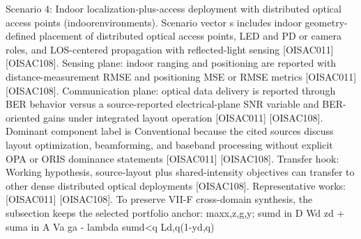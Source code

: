 {}Scenario 4: Indoor localization-plus-access deployment with distributed optical access points (indoor\markdownRendererUnderscore{}environments).\markdownRendererHardLineBreak
{}Scenario vector s includes indoor geometry-defined placement of distributed optical access points, LED and PD or camera roles, and LOS-centered propagation with reflected-light sensing [O\markdownRendererUnderscore{}ISAC\markdownRendererUnderscore{}011] [O\markdownRendererUnderscore{}ISAC\markdownRendererUnderscore{}108]. Sensing plane: indoor ranging and positioning are reported with distance-measurement RMSE and positioning MSE or RMSE metrics [O\markdownRendererUnderscore{}ISAC\markdownRendererUnderscore{}011] [O\markdownRendererUnderscore{}ISAC\markdownRendererUnderscore{}108]. Communication plane: optical data delivery is reported through BER behavior versus a source-reported electrical-plane SNR variable and BER-oriented gains under integrated layout operation [O\markdownRendererUnderscore{}ISAC\markdownRendererUnderscore{}011] [O\markdownRendererUnderscore{}ISAC\markdownRendererUnderscore{}108]. Dominant component label is Conventional because the cited sources discuss layout optimization, beamforming, and baseband processing without explicit OPA or ORIS dominance statements [O\markdownRendererUnderscore{}ISAC\markdownRendererUnderscore{}011] [O\markdownRendererUnderscore{}ISAC\markdownRendererUnderscore{}108]. Transfer hook: Working hypothesis, source-layout plus shared-intensity objectives can transfer to other dense distributed optical deployments [O\markdownRendererUnderscore{}ISAC\markdownRendererUnderscore{}108]. Representative works: [O\markdownRendererUnderscore{}ISAC\markdownRendererUnderscore{}011] [O\markdownRendererUnderscore{}ISAC\markdownRendererUnderscore{}108].\markdownRendererInterblockSeparator
{}
\markdownRendererSectionEnd \markdownRendererSectionBegin
{}\markdownRendererInterblockSeparator
{}To preserve VII-F cross-domain synthesis, the subsection keeps the selected portfolio anchor:\markdownRendererParagraphSeparator
{}\markdownRendererDollarSign{}\markdownRendererDollarSign{}\markdownRendererSoftLineBreak
{}\markdownRendererBackslash{}max\markdownRendererUnderscore{}\markdownRendererLeftBrace{}x,z,g,y\markdownRendererRightBrace{}; \markdownRendererBackslash{}sum\markdownRendererUnderscore{}\markdownRendererLeftBrace{}d \markdownRendererBackslash{}in D\markdownRendererRightBrace{} W\markdownRendererUnderscore{}d z\markdownRendererUnderscore{}d + \markdownRendererBackslash{}sum\markdownRendererUnderscore{}\markdownRendererLeftBrace{}a \markdownRendererBackslash{}in A\markdownRendererRightBrace{} V\markdownRendererUnderscore{}a g\markdownRendererUnderscore{}a - \markdownRendererBackslash{}lambda \markdownRendererBackslash{}sum\markdownRendererUnderscore{}\markdownRendererLeftBrace{}d<q\markdownRendererRightBrace{} L\markdownRendererUnderscore{}\markdownRendererLeftBrace{}d,q\markdownRendererRightBrace{}(1-y\markdownRendererUnderscore{}\markdownRendererLeftBrace{}d,q\markdownRendererRightBrace{})\markdownRendererSoftLineBreak
